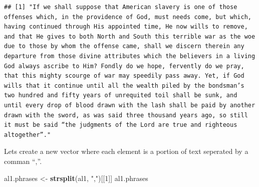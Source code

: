 \documentclass[
]{book}
\newenvironment{Shaded}{\begin{snugshade}}{\end{snugshade}}
\newcommand{\DecValTok}[1]{\textcolor[rgb]{0.00,0.00,0.81}{#1}}
\newcommand{\KeywordTok}[1]{\textcolor[rgb]{0.13,0.29,0.53}{\textbf{#1}}}
\newcommand{\NormalTok}[1]{#1}
\newcommand{\StringTok}[1]{\textcolor[rgb]{0.31,0.60,0.02}{#1}}
\begin{document}
\begin{verbatim}
## [1] "If we shall suppose that American slavery is one of those offenses which, in the providence of God, must needs come, but which, having continued through His appointed time, He now wills to remove, and that He gives to both North and South this terrible war as the woe due to those by whom the offense came, shall we discern therein any departure from those divine attributes which the believers in a living God always ascribe to Him? Fondly do we hope, fervently do we pray, that this mighty scourge of war may speedily pass away. Yet, if God wills that it continue until all the wealth piled by the bondsman’s two hundred and fifty years of unrequited toil shall be sunk, and until every drop of blood drawn with the lash shall be paid by another drawn with the sword, as was said three thousand years ago, so still it must be said “the judgments of the Lord are true and righteous altogether”."
\end{verbatim}

Lets create a new vector where each element is a portion of text seperated by a comman ``,''.

\begin{Shaded}
\begin{Highlighting}[]
\NormalTok{al1.phrases <-}\StringTok{ }\KeywordTok{strsplit}\NormalTok{(al1, }\StringTok{","}\NormalTok{)[[}\DecValTok{1}\NormalTok{]]}
\NormalTok{al1.phrases}
\end{Highlighting}
\end{Shaded}
\end{document}
